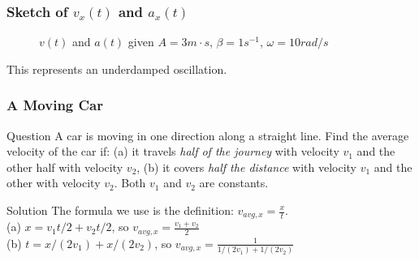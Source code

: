 \begin{frame}
\frametitle{Sketch of $v_x(t)$ and $a_x(t)$}
\begin{figure}[H]
\centering
{}
\caption{$v(t)$ and $a(t)$ given $A=3\unit{m\cdot s}$, $\beta=1\unit{s^{-1}}$, $\omega=10\unit{rad/s}$}
\end{figure}
This represents an \alert{underdamped oscillation}.
\end{frame}
\begin{frame}
\frametitle{A Moving Car}
\begin{block}{Question}
A car is moving in one direction along a \alert{straight line}. Find the \alert{average velocity} of the car if: (a) it travels \emph{half of the journey} with velocity $v_{1}$ and the other half with velocity $v_{2}$, (b) it covers \emph{half the distance} with velocity $v_{1}$ and the other with velocity $v_2$. Both $v_1$ and $v_2$ are constants.
\end{block}
\begin{block}{Solution}
The formula we use is the \alert{definition}: $v_{avg,x}=\frac{x}{t}$.\\
(a) $x=v_{1}t/2+v_{2}t/2$, so $v_{avg,x}=\frac{v_{1}+v_{2}}{2}$\\
(b) $t=x/(2v_1)+x/(2v_2)$, so $v_{avg,x}=\frac{1}{1/(2v_1)+1/(2v_2)}$
\end{block}
\end{frame}
